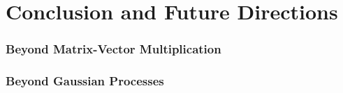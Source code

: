 \chapter{Conclusion and Future Directions}
\label{chapter:discussion}



\subsection{Beyond Matrix-Vector Multiplication}




\subsection{Beyond Gaussian Processes}

